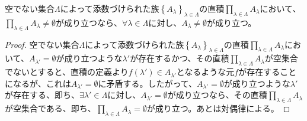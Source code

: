 \documentclass[a4paper]{jsarticle}
\begin{document}
\begin{thm}
\label{1.2.1.21}
空でない集合$\varLambda$によって添数づけられた族$\left\{ A_{\lambda} \right\}_{\lambda \in \varLambda}$の直積$\prod_{\lambda \in \varLambda} A_{\lambda}$において、$\prod_{\lambda \in \varLambda} A_{\lambda} \neq \emptyset$が成り立つなら、$\forall\lambda \in \varLambda$に対し、$A_{\lambda} \neq \emptyset$が成り立つ。
\end{thm}
\begin{proof}
空でない集合$\varLambda$によって添数づけられた族$\left\{ A_{\lambda} \right\}_{\lambda \in \varLambda}$の直積$\prod_{\lambda \in \varLambda} A_{\lambda}$において、$A_{\lambda'} = \emptyset$が成り立つような$\lambda'$が存在するかつ、その直積$\prod_{\lambda \in \varLambda} A_{\lambda}$が空集合でないとすると、直積の定義より$f\left( \lambda' \right) \in A_{\lambda'}$となるような元$f$が存在することになるが、これは$A_{\lambda'} = \emptyset$に矛盾する。したがって、$A_{\lambda'} = \emptyset$が成り立つような$\lambda'$が存在する、即ち、$\exists\lambda' \in \varLambda$に対し、$A_{\lambda'} = \emptyset$が成り立つなら、その直積$\prod_{\lambda \in \varLambda} A_{\lambda}$が空集合である、即ち、$\prod_{\lambda \in \varLambda} A_{\lambda} = \emptyset$が成り立つ。あとは対偶律による。
\end{proof}
\end{document}
